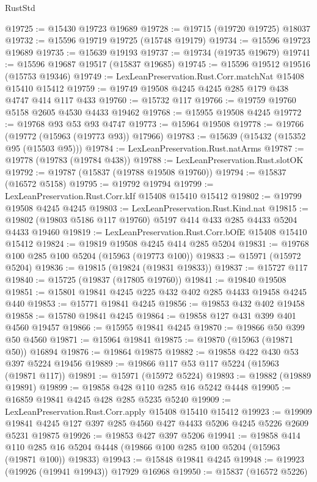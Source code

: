 \begin{lexlean}{RustStd}
\begin{coremodule}
@19725 := @15430 @19723 @19689
@19728 := @19715 (@19720 @19725) @18037
@19732 := @15596 @19719 @19725 (@15748 @19179)
@19734 := @15596 @19723 @19689
@19735 := @15639 @19193
@19737 := @19734 (@19735 @19679)
@19741 := @15596 @19687 @19517 (@15837 @19685)
@19745 := @15596 @19512 @19516 (@15753 @19346)
@19749 := LexLeanPreservation.Rust.Corr.matchNat @15408 @15410 @15412
@19759 := @19749 @19508 @4245 @4245 @285 @179 @438 @4747 @414 @117 @433
@19760 := @15732 @117
@19766 := @19759 @19760 @5158 @2605 @4530 @4433 @19462
@19768 := @15955 @19508 @4245
@19772 := @19768 @93 @53 @93 @4747
@19773 := @15964 @19508
@19778 := @19766 (@19772 (@15963 (@19773 @93)) @17966)
@19783 := @15639 (@15432 (@15352 @95 (@15503 @95)))
@19784 := LexLeanPreservation.Rust.natArms
@19787 := @19778 (@19783 (@19784 @438))
@19788 := LexLeanPreservation.Rust.slotOK
@19792 := @19787 (@15837 (@19788 @19508 @19760))
@19794 := @15837 (@16572 @5158)
@19795 := @19792 @19794
@19799 := LexLeanPreservation.Rust.Corr.kIf @15408 @15410 @15412
@19802 := @19799 @19508 @4245 @4245
@19803 := LexLeanPreservation.Rust.Kind.nat
@19815 := @19802 (@19803 @5186 @117 @19760) @5197 @414 @433 @285 @4433 @5204 @4433 @19460
@19819 := LexLeanPreservation.Rust.Corr.bOfE @15408 @15410 @15412
@19824 := @19819 @19508 @4245 @414 @285 @5204
@19831 := @19768 @100 @285 @100 @5204 (@15963 (@19773 @100))
@19833 := @15971 (@15972 @5204)
@19836 := @19815 (@19824 (@19831 @19833))
@19837 := @15727 @117
@19840 := @15725 (@19837 (@17805 @19760))
@19841 := @19840 @19508
@19851 := @15801 @19841 @4245 @225 @432 @402 @285 @4433 @19458 @4245 @440
@19853 := @15771 @19841 @4245
@19856 := @19853 @432 @402 @19458
@19858 := @15780 @19841 @4245
@19864 := @19858 @127 @431 @399 @401 @4560 @19457
@19866 := @15955 @19841 @4245
@19870 := @19866 @50 @399 @50 @4560
@19871 := @15964 @19841
@19875 := @19870 (@15963 (@19871 @50)) @16894
@19876 := @19864 @19875
@19882 := @19858 @422 @430 @53 @397 @5224 @19456
@19889 := @19866 @117 @53 @117 @5224 (@15963 (@19871 @117))
@19891 := @15971 (@15972 @5224)
@19893 := @19882 (@19889 @19891)
@19899 := @19858 @428 @110 @285 @16 @5242 @4448
@19905 := @16859 @19841 @4245 @428 @285 @5235 @5240
@19909 := LexLeanPreservation.Rust.Corr.apply @15408 @15410 @15412
@19923 := @19909 @19841 @4245 @127 @397 @285 @4560 @427 @4433 @5206 @4245 @5226 @2609 @5231 @19875
@19926 := @19853 @427 @397 @5206
@19941 := @19858
    @414
    @110
    @285
    @16
    @5204
    @4448
    (@19866 @100 @285 @100 @5204 (@15963 (@19871 @100)) @19833)
@19943 := @15848 @19841 @4245
@19948 := @19923 (@19926 (@19941 @19943)) @17929 @16968
@19950 := @15837 (@16572 @5226)

\end{coremodule}
\end{lexlean}
